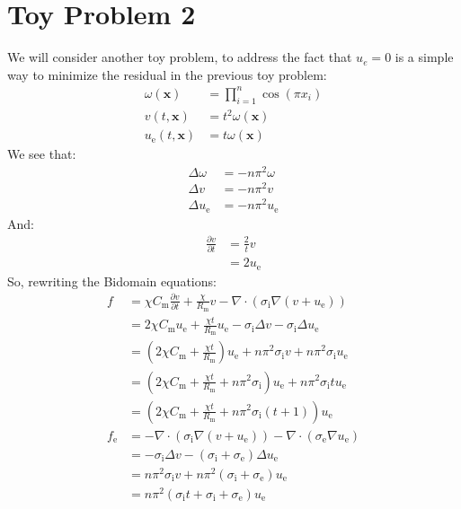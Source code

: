 \documentclass{article}
\newcommand{\bvec}[1]{\boldsymbol{#1}}
\begin{document}
\newpage

\section{Toy Problem 2}

We will consider another toy problem,
to address the fact that $u_e = 0$
is a simple way to minimize the residual in the previous toy problem:
\begin{align*}
    \omega(\bvec{x}) & = \prod_{i = 1}^n \cos(\pi x_i) \\
    v(t, \bvec{x}) & = t^2 \omega(\bvec{x}) \\
    u_\text{e}(t, \bvec{x}) & = t \omega(\bvec{x})
\end{align*}
\noindent We see that:
\begin{align*}
    \Delta \omega & = -n \pi^2 \omega \\
    \Delta v & = -n \pi^2 v \\
    \Delta u_\text{e} & = -n \pi^2 u_\text{e}
\end{align*}
\noindent And:
\begin{align*}
    \frac{\partial v}{\partial t} & = \frac{2}{t} v \\
        & = 2 u_\text{e}
\end{align*}
\noindent So, rewriting the Bidomain equations:
\begin{align*}
    f
        & = \chi C_\text{m} \frac{\partial v}{\partial t}
            + \frac{\chi}{R_\text{m}} v
            - \nabla \cdot (\sigma_\text{i} \nabla (v + u_\text{e})) \\
        & = 2 \chi C_\text{m} u_\text{e}
            + \frac{\chi t}{R_\text{m}} u_\text{e}
            - \sigma_\text{i} \Delta v
            - \sigma_\text{i} \Delta u_\text{e} \\
        & = (2 \chi C_\text{m} + \frac{\chi t}{R_\text{m}}) u_\text{e}
            + n \pi^2 \sigma_\text{i} v
            + n \pi^2 \sigma_\text{i} u_\text{e} \\
        & = (2 \chi C_\text{m} + \frac{\chi t}{R_\text{m}} + n \pi^2 \sigma_\text{i}) u_\text{e}
            + n \pi^2 \sigma_\text{i} t u_\text{e} \\
        & = (2 \chi C_\text{m} + \frac{\chi t}{R_\text{m}} + n \pi^2 \sigma_\text{i} (t + 1)) u_\text{e} \\
    f_\text{e}
        & = -\nabla \cdot (\sigma_\text{i} \nabla (v + u_\text{e}))
            - \nabla \cdot (\sigma_\text{e} \nabla u_\text{e}) \\
        & = -\sigma_\text{i} \Delta v
            - (\sigma_\text{i} + \sigma_\text{e}) \Delta u_\text{e} \\
        & = n \pi^2 \sigma_\text{i} v
            + n \pi^2 (\sigma_\text{i} + \sigma_\text{e}) u_\text{e} \\
        & = n \pi^2 (\sigma_\text{i} t + \sigma_\text{i} + \sigma_\text{e}) u_\text{e}
\end{align*}
\end{document}

